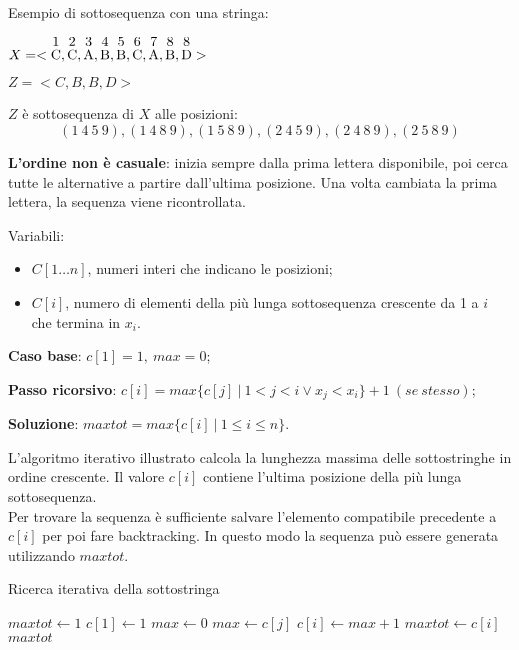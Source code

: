 Esempio di sottosequenza con una stringa:

$X = <\stackon{C}{1}, \stackon{C}{2}, \stackon{A}{3}, \stackon{B}{4}, \stackon{B}{5}, \stackon{C}{6}, \stackon{A}{7}, \stackon{B}{8}, \stackon{D}{8}>$

$Z = <C, B, B, D>$

$Z$ è sottosequenza di $X$ alle posizioni:
$$(1\ 4\ 5\ 9), (1\ 4\ 8\ 9), (1\ 5\ 8\ 9), (2\ 4\ 5\ 9), (2\ 4\ 8\ 9), (2\ 5\ 8\ 9)$$

\textbf{L'ordine non è casuale}: inizia sempre dalla prima lettera disponibile, poi cerca tutte le alternative a partire dall'ultima posizione. Una volta cambiata la prima lettera, la sequenza viene ricontrollata.

Variabili:
\begin{itemize}
	\item $C[1\dots n]$, numeri interi che indicano le posizioni;
	\item $C[i]$, numero di elementi della più lunga sottosequenza crescente da 1 a $i$ che termina in $x_i$.
\end{itemize}

\textbf{Caso base}: $c[1] = 1,\ max = 0$;

\textbf{Passo ricorsivo}: $c[i] = max\{c[j]\ |\ 1 < j < i \lor x_j < x_i\} + 1\ (se\ stesso)$;

\textbf{Soluzione}: $maxtot = max\{c[i]\ |\ 1 \leq i \leq n\}$.

L'algoritmo iterativo illustrato calcola la lunghezza massima delle sottostringhe in ordine crescente. Il valore $c[i]$ contiene l'ultima posizione della più lunga sottosequenza. \\
Per trovare la sequenza è sufficiente salvare l'elemento compatibile precedente a $c[i]$ per poi fare backtracking. In questo modo la sequenza può essere generata utilizzando $maxtot$. \par 

\begin{algorithm}[H]
	\caption{Ricerca iterativa della sottostringa}
	\begin{algorithmic}
		\State $maxtot \gets 1$
		\State $c[1] \gets 1$
			\State $max \gets 0$
					\State $max \gets c[j]$
				\EndIf
				\State $c[i] \gets max + 1$
					\State $maxtot \gets c[i]$
				\EndIf
			\EndFor
		\EndFor
		\State \Return $maxtot$
		\EndFunction
	\end{algorithmic}
\end{algorithm}

